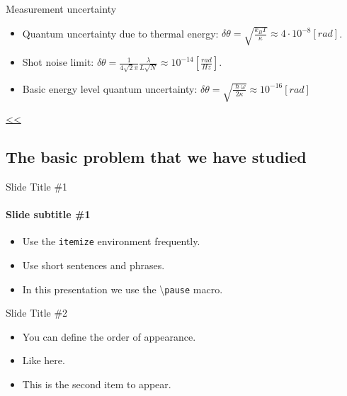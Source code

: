 \documentclass{beamer}
\begin{document}
\begin{frame}{\hypertarget{frame:Measurement uncertainty 1}{Measurement uncertainty}}
	\begin{itemize}
		\framesubtitle{Fundamental limits}
		\item Quantum uncertainty due to thermal energy: $\delta\theta = \sqrt{\frac{k_B T}{\kappa}} \approx 4\cdot 10^{-8} [rad]$.
		\item Shot noise limit: $\delta\theta = \frac{1}{4\sqrt{2}\pi}\frac{\lambda}{L\sqrt{N}} \approx 10^{-14} [\frac{rad}{Hz}]$.
		\item Basic energy level quantum uncertainty: $\delta\theta= \sqrt{\frac{\hslash\omega}{2\kappa}} \approx 10^{-16} [rad]$

		
	\end{itemize}
	\hyperlink{frame:Measurement uncertainty}{<<}
\end{frame}













\iffalse

\subsection[Basic Problem]{The basic problem that we have studied}

\begin{frame}{Slide Title \#1}
	\framesubtitle{Slide subtitle \#1}
	\begin{itemize}
		\item Use the \texttt{itemize} environment frequently.
		\pause
		\item Use short sentences and phrases.
		\pause
		\item In this presentation we use the \textbackslash{}\texttt{pause} macro.
	\end{itemize}
\end{frame}

\begin{frame}{Slide Title \#2}
	\begin{itemize}
		\item <1->You can define the order of appearance.
		\item <3->Like here.
		\item <2->This is the second item to appear.
	\end{itemize}
\end{frame}
\end{document}
